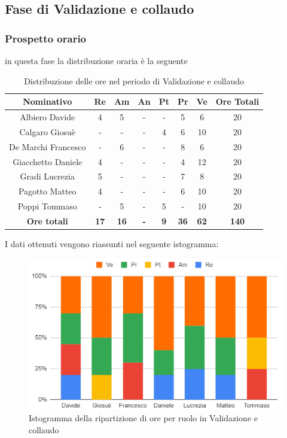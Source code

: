 \subsection{Fase di Validazione e collaudo}
\subsubsection{Prospetto orario}
in questa fase la distribuzione oraria è la seguente
\begin{table}[H]
		\begin{center}
			\setlength{\aboverulesep}{0pt}
			\setlength{\belowrulesep}{0pt}
			\setlength{\extrarowheight}{.75ex}
			\begin{tabular}{ c c c c c c c c }
				\rowcolor{AzzurroGruppo!30} 
				\textbf{Nominativo} & \textbf{Re} & \textbf{Am} & \textbf{An} & \textbf{Pt} & \textbf{Pr} & \textbf{Ve} & \textbf{Ore Totali}  \\
				\toprule
				Albiero Davide      & 4 & 5 & - & - & 5 & 6 & 20 \\
				Calgaro Giosuè      & - & - & - & 4 & 6 & 10 & 20 \\
				De Marchi Francesco & - & 6 & - & - & 8 & 6 & 20\\
				Giacchetto Daniele  & 4 & - & - & - & 4 & 12 & 20\\
				Gradi Lucrezia      & 5 & - & - & - & 7 & 8 & 20\\
				Pagotto Matteo      & 4 & - & - & - & 6 & 10 & 20\\
				Poppi Tommaso       & - & 5 & - & 5 & - & 10 & 20\\
				 \textbf{Ore totali} & \textbf{17} & \textbf{16} & \textbf{-} & \textbf{9} & \textbf{36} & \textbf{62} & \textbf{140} \\
				\bottomrule
			\end{tabular}
			\caption{Distribuzione delle ore nel periodo di Validazione e collaudo}
		\end{center}
	\end{table}
	I dati ottenuti vengono riassunti nel seguente istogramma:
	\begin{figure}[H]
    \centering
    \includegraphics[scale = 0.5]{components/img/validazione_isto.png}
    \caption{Istogramma della ripartizione di ore per ruolo in Validazione e collaudo}
    \label{fig:logo}
\end{figure}

